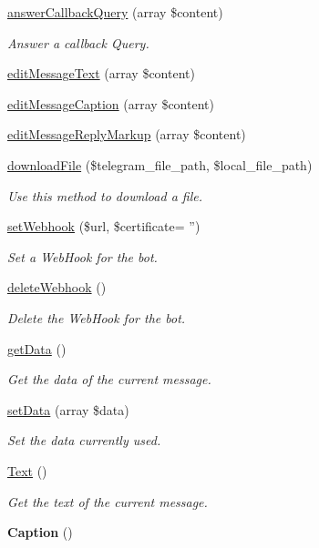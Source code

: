 \begin{DoxyCompactItemize}
\hyperlink{class_telegram_a55fa1d6bbcca385e333b402894e8ca37}{answer\-Callback\-Query} (array \$content)
\begin{DoxyCompactList}\small\item\em Answer a callback Query. \end{DoxyCompactList}\item 
\hyperlink{class_telegram_afbc4f6fd5f28a20e1bea0b083863b688}{edit\-Message\-Text} (array \$content)
\item 
\hyperlink{class_telegram_a3531b07c9dc7afb693c6e956e5debdad}{edit\-Message\-Caption} (array \$content)
\item 
\hyperlink{class_telegram_acd615562e6a6eeeb3d8a825eb03e3e5f}{edit\-Message\-Reply\-Markup} (array \$content)
\item 
\hyperlink{class_telegram_af08c6bc7982d71857f05c0756221a703}{download\-File} (\$telegram\-\_\-file\-\_\-path, \$local\-\_\-file\-\_\-path)
\begin{DoxyCompactList}\small\item\em Use this method to download a file. \end{DoxyCompactList}\item 
\hyperlink{class_telegram_a460bc346782ab380344e7fba7de6968c}{set\-Webhook} (\$url, \$certificate= '')
\begin{DoxyCompactList}\small\item\em Set a Web\-Hook for the bot. \end{DoxyCompactList}\item 
\hyperlink{class_telegram_ad90cef56fdc7dfcc40318a78bf5aed71}{delete\-Webhook} ()
\begin{DoxyCompactList}\small\item\em Delete the Web\-Hook for the bot. \end{DoxyCompactList}\item 
\hyperlink{class_telegram_a81a67162a6288d78fc4c55283325f0b4}{get\-Data} ()
\begin{DoxyCompactList}\small\item\em Get the data of the current message. \end{DoxyCompactList}\item 
\hypertarget{class_telegram_a87449bdd364c33ff024d32896342bf31}{\hyperlink{class_telegram_a87449bdd364c33ff024d32896342bf31}{set\-Data} (array \$data)}\label{class_telegram_a87449bdd364c33ff024d32896342bf31}

\begin{DoxyCompactList}\small\item\em Set the data currently used. \end{DoxyCompactList}\item 
\hyperlink{class_telegram_a950a98ae75562dc9c6a458acbd330143}{Text} ()
\begin{DoxyCompactList}\small\item\em Get the text of the current message. \end{DoxyCompactList}\item 
\hypertarget{class_telegram_a07507e380581a106bb2af2cbae4d7ff1}{{\bfseries Caption} ()}\label{class_telegram_a07507e380581a106bb2af2cbae4d7ff1}


\end{DoxyCompactItemize}
